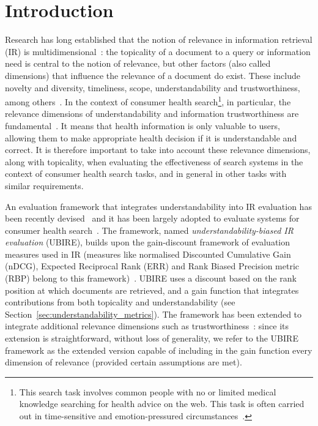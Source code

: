 \section{Introduction}
\label{chp:evaluation_metrics}

Research has long established that the notion of relevance in information retrieval (IR) is multidimensional~\cite{schamber94,borlund03}: the topicality of a document to a query or information need is central to the notion of relevance, but other factors (also called dimensions) that influence the relevance of a document do exist. These include novelty and diversity, timeliness, scope, understandability and trustworthiness, among others~\cite{park93,schamber94}. In the context of consumer health search\footnote{This search task involves common people with no or limited medical knowledge searching for health advice on the web. This task is often carried out in time-sensitive and emotion-pressured circumstances~\cite{hersh08,mishra2014time}.}, in particular, the relevance dimensions of understandability and information trustworthiness are fundamental~\cite{hersh08}. 
It means that health information is only valuable to users, allowing them to make appropriate health decision if it is understandable and correct. 
It is therefore important to take into account these relevance dimensions, along with topicality, when evaluating the effectiveness of search systems in the context of consumer health search tasks, and in general in other tasks with similar requirements.

An evaluation framework that integrates understandability into IR evaluation has been recently devised~\cite{zuccon14,zuccon16} and it has been largely adopted to evaluate systems for consumer health search~\cite{clefIR15,clefIR16,clefIR17}. The framework, named \textit{understandability-biased IR evaluation} (UBIRE), builds upon the gain-discount framework of evaluation measures used in IR (measures like normalised Discounted Cumulative Gain (nDCG),
Expected Reciprocal Rank (ERR) and Rank Biased Precision metric (RBP) belong to this framework)~\cite{carterette11}. UBIRE uses a discount based on the rank position at which documents are retrieved, and a gain function that integrates contributions from both topicality and understandability (see Section~\ref{sec:understandability_metrics}). The framework has been extended to integrate additional relevance dimensions such as trustworthiness~\cite{clefIR17}: since its extension is straightforward, without loss of generality, we refer to the UBIRE framework as the extended version capable of including in the gain function every dimension of relevance (provided certain assumptions are met). 

